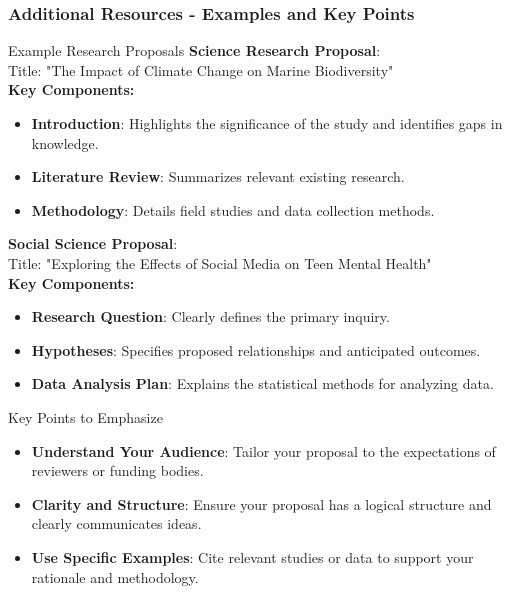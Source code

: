 \documentclass[aspectratio=169]{beamer}
\begin{document}
\begin{frame}[fragile]
    \frametitle{Additional Resources - Examples and Key Points}
    \begin{block}{Example Research Proposals}
        \textbf{Science Research Proposal}:\\
        Title: "The Impact of Climate Change on Marine Biodiversity"\\
        \textbf{Key Components:}
        \begin{itemize}
            \item \textbf{Introduction}: Highlights the significance of the study and identifies gaps in knowledge.
            \item \textbf{Literature Review}: Summarizes relevant existing research.
            \item \textbf{Methodology}: Details field studies and data collection methods.
        \end{itemize}

        \textbf{Social Science Proposal}:\\
        Title: "Exploring the Effects of Social Media on Teen Mental Health"\\
        \textbf{Key Components:}
        \begin{itemize}
            \item \textbf{Research Question}: Clearly defines the primary inquiry.
            \item \textbf{Hypotheses}: Specifies proposed relationships and anticipated outcomes.
            \item \textbf{Data Analysis Plan}: Explains the statistical methods for analyzing data.
        \end{itemize}
    \end{block}

    \begin{block}{Key Points to Emphasize}
        \begin{itemize}
            \item \textbf{Understand Your Audience}: Tailor your proposal to the expectations of reviewers or funding bodies.
            \item \textbf{Clarity and Structure}: Ensure your proposal has a logical structure and clearly communicates ideas.
            \item \textbf{Use Specific Examples}: Cite relevant studies or data to support your rationale and methodology.
        \end{itemize}
    \end{block}
\end{frame}
\end{document}
